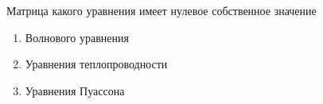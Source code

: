 Матрица какого уравнения имеет нулевое собственное значение

\begin{enumerate}[label=\arabic*)]
    \item Волнового уравнения
    \item Уравнения теплопроводности
    \item Уравнения Пуассона
\end{enumerate}

